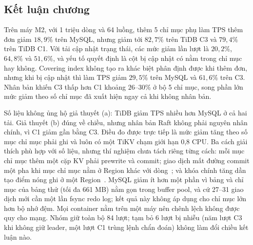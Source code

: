 \subsection{Kết luận chương}

Trên máy M2, với 1 triệu dòng và 64 luồng, thêm 5 chỉ mục phụ làm TPS thêm đơn giảm $18{,}9\%$ trên MySQL, nhưng giảm tới $82{,}7\%$ trên TiDB C3 và $79{,}4\%$ trên TiDB C1. Với tải cập nhật trạng thái, các mức giảm lần lượt là $20{,}2\%$, $64{,}8\%$ và $51{,}6\%$, và yếu tố quyết định là cột bị cập nhật có nằm trong chỉ mục hay không. Covering index không tạo ra khác biệt phân định được khi thêm đơn, nhưng khi  bị cập nhật thì làm TPS giảm $29{,}5\%$ trên MySQL và $61{,}6\%$ trên C3. Nhân bản khiến C3 thấp hơn C1 khoảng $26$--$30\%$ ở bộ 5 chỉ mục, song phần lớn mức giảm theo số chỉ mục đã xuất hiện ngay cả khi không nhân bản.

Số liệu không ủng hộ giả thuyết (a): TiDB giảm TPS nhiều hơn MySQL ở cả hai tải. Giả thuyết (b) đúng về chiều, nhưng nhân bản Raft không phải nguyên nhân chính, vì C1 giảm gần bằng C3. Điều đo được trực tiếp là mức giảm tăng theo số mục chỉ mục phải ghi và luôn có một TiKV chạm giới hạn 0,8 CPU. Ba cách giải thích phù hợp với số liệu, nhưng thí nghiệm chưa tách riêng từng cách: mỗi mục chỉ mục thêm một cặp KV phải prewrite và commit; giao dịch mất đường commit một pha khi mục chỉ mục nằm ở Region khác với dòng~\cite{tidb_sysvars}; và khóa chính tăng dần tạo điểm nóng ghi ở một Region~\cite{tidb_hotspot}. MySQL giảm ít hơn một phần vì bảng và chỉ mục của bảng thử (tối đa 661 MB) nằm gọn trong buffer pool, và cứ 27--31 giao dịch mới cần một lần fsync redo log; kết quả này không áp dụng cho chỉ mục lớn hơn bộ nhớ đệm. Mọi container nằm trên một máy nên chênh lệch không được quy cho mạng. Nhóm giữ toàn bộ 84 lượt; tạm bỏ 6 lượt bị nhiễu (năm lượt C3 khi  không giữ leader, một lượt C1 trùng lệnh chẩn đoán) không làm đổi chiều kết luận nào.
